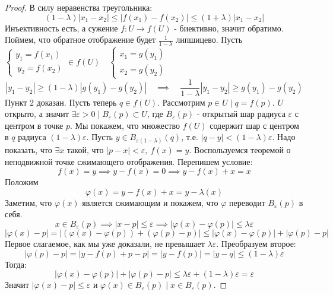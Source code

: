 \begin{lemma*}
\begin{proof}
        В силу неравенства треугольника:
        \[(1 - \lambda) \left| x_1 - x_2 \right| \leq \left| f(x_1) - f(x_2) \right| \leq (1 + \lambda)\left| x_1 - x_2\right|\]
        Инъективность есть, а сужение $f: U \to f(U)$ - биективно, значит обратимо. Поймем, что обратное отображение будет $\frac{1}{1 - \lambda}$ липшицево.
        Пусть $\begin{cases}
            y_1 = f(x_1) \\ \ y_2 = f(x_2) 
        \end{cases} \in f(U) \quad \begin{cases}
            x_1 = g(y_1) \\ 
            x_2 = g(y_2)
        \end{cases}$
        \[\left| y_1 - y_2 \right| \geq (1 - \lambda)\left|g(y_1) - g(y_2) \right| \quad \implies \quad \frac{1}{1 - \lambda}\left| y_1 - y_2 \right| \geq g(y_1) - g(y_2)\] 
        Пункт 2 доказан.
        \newline
        Пусть теперь $q \in f(U)$. Рассмотрим $p \in U \mid q = f(p)$. $U$ открыто, а значит $\exists \varepsilon > 0 \mid B_\varepsilon(p) \subset U$, \newline 
        где $B_\varepsilon(p)$ - открытый шар радиуса $\varepsilon$ с центром в точке $p$. Мы покажем, что множество $f(U)$ содержит шар с центром в $q$ радиуса $(1- \lambda)\varepsilon$. \newline
        Пусть $y \in B_{\varepsilon(1-\lambda)}(q)$, т.е. $\left| q - y \right| < (1 - \lambda)\varepsilon$. 
        Надо показать, что $\exists x \text{ такой, что } \left| p - x \right| < \varepsilon, \ f(x) = y$.
        Воспользуемся теоремой о неподвижной точке сжимающего отображения. Перепишем условие:
        \[f(x) = y \implies y - f(x) = 0 \implies y-f(x) + x = x\]
        Положим
        \[\varphi(x) = y - f(x) + x = y - \lambda(x)\]
        Заметим, что $\varphi(x)$ является сжимающим и покажем, что $\varphi$ переводит $B_\varepsilon(p)$ в себя. 
        \[x \in B_\varepsilon(p) \implies \left| x - p \right| \leq \varepsilon \implies \left| \varphi(x) - \varphi(p) \right| \leq \lambda\varepsilon\]
        \[\left| \varphi(x) - p \right| = \left| (\varphi(x) - \varphi(p)) + (\varphi(p) - p)\right| \leq \left| \varphi(x) - \varphi(p) \right| + \left|\varphi(p) - p\right|\]
        Первое слагаемое, как мы уже доказали, не превышает $\lambda \varepsilon$. Преобразуем второе:
        \[\left| \varphi(p) - p \right| = \left| y - f(p) + p - p \right| = \left| y - f(p) \right| = \left| y - q\right| \leq (1- \lambda)\varepsilon\]
        Тогда:
        \[\left| \varphi(x) - \varphi(p) \right| + \left|\varphi(p) - p\right| \leq \lambda\varepsilon + (1 - \lambda) \varepsilon = \varepsilon\]
        Значит $\left|\varphi(x) - p\right| \leq \varepsilon$ и $\varphi(x) \in B_\varepsilon(p) \mid x \in B_\varepsilon(p).$
    \end{proof}
\end{lemma*}
